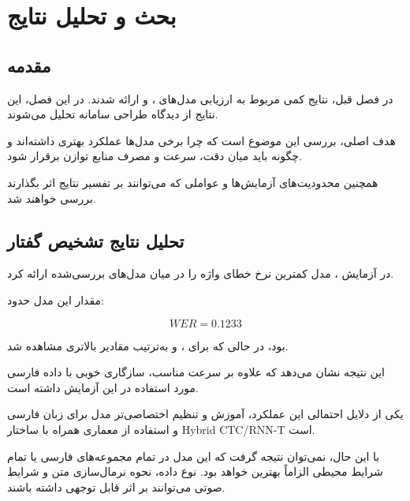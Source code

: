 
\chapter{بحث و تحلیل نتایج}

\section{مقدمه}

در فصل قبل، نتایج کمی مربوط به ارزیابی مدل‌های ،  و
 ارائه شدند.
در این فصل، این نتایج از دیدگاه طراحی سامانه تحلیل می‌شوند.

هدف اصلی، بررسی این موضوع است که چرا برخی مدل‌ها عملکرد بهتری
داشته‌اند و چگونه باید میان دقت، سرعت و مصرف منابع توازن
برقرار شود.

همچنین محدودیت‌های آزمایش‌ها و عواملی که می‌توانند بر
تفسیر نتایج اثر بگذارند بررسی خواهند شد.


\section{تحلیل نتایج تشخیص گفتار}

در آزمایش ، مدل  کمترین نرخ خطای واژه
را در میان مدل‌های بررسی‌شده ارائه کرد.

مقدار  این مدل حدود:

\begin{equation}
WER = 0.1233
\end{equation}

بود، در حالی که برای ،  و  به‌ترتیب
مقادیر بالاتری مشاهده شد.

این نتیجه نشان می‌دهد که  علاوه بر سرعت مناسب،
سازگاری خوبی با داده فارسی مورد استفاده در این آزمایش داشته است.

یکی از دلایل احتمالی این عملکرد، آموزش و تنظیم اختصاصی‌تر
مدل برای زبان فارسی و استفاده از معماری  همراه
با ساختار Hybrid CTC/RNN-T است.

با این حال، نمی‌توان نتیجه گرفت که این مدل در تمام مجموعه‌های
فارسی یا تمام شرایط محیطی الزاماً بهترین خواهد بود.
نوع داده، نحوه نرمال‌سازی متن و شرایط صوتی می‌توانند بر 
اثر قابل توجهی داشته باشند.


